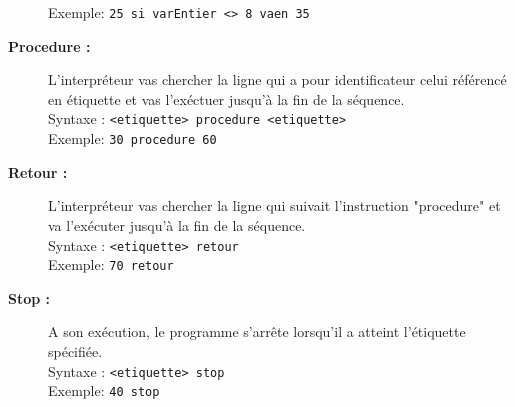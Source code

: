 \begin{description}
	Exemple: \verb|25 si varEntier <> 8 vaen 35|

	\item [\textbf{Procedure :}] L'interpréteur vas chercher la ligne qui a pour identificateur celui référencé en étiquette et vas l'exéctuer jusqu'à la fin de la séquence.\\
	Syntaxe :
	\verb|<etiquette> procedure <etiquette>|\\

	Exemple: \verb|30 procedure 60|

	\item [\textbf{Retour :}] L'interpréteur vas chercher la ligne qui suivait l'instruction "procedure" et va l'exécuter jusqu'à la fin de la séquence.\\
	Syntaxe :
	\verb|<etiquette> retour|\\

	Exemple: \verb|70 retour|

	\item [\textbf{Stop :}] A son exécution, le programme s'arrête lorsqu'il a atteint l'étiquette spécifiée.\\
	Syntaxe :
	\verb|<etiquette> stop|\\

	Exemple: \verb|40 stop|
\end{description}